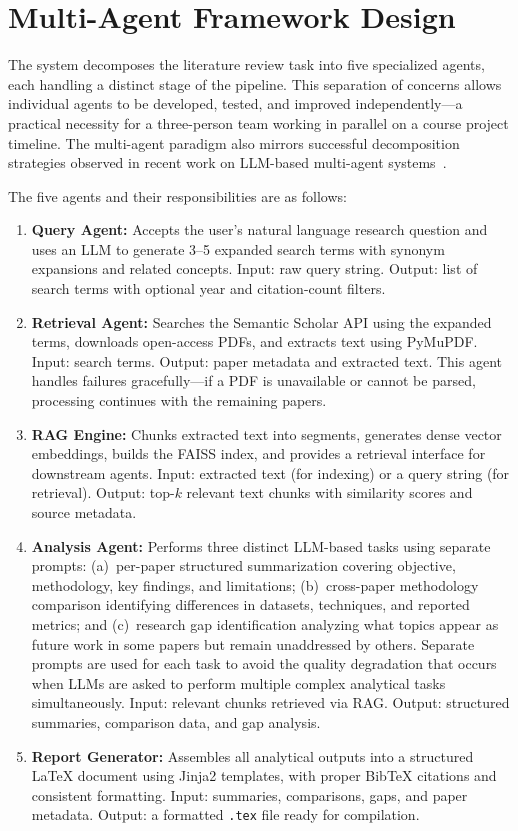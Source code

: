 \documentclass[12pt,a4paper]{article}
\begin{document}
\section{Multi-Agent Framework Design}

The system decomposes the literature review task into five specialized agents, each handling a distinct stage of the pipeline. This separation of concerns allows individual agents to be developed, tested, and improved independently---a practical necessity for a three-person team working in parallel on a course project timeline. The multi-agent paradigm also mirrors successful decomposition strategies observed in recent work on LLM-based multi-agent systems~\citep{guo2024multiagent}.

The five agents and their responsibilities are as follows:

\begin{enumerate}
    \item \textbf{Query Agent:} Accepts the user's natural language research question and uses an LLM to generate 3--5 expanded search terms with synonym expansions and related concepts. Input: raw query string. Output: list of search terms with optional year and citation-count filters.

    \item \textbf{Retrieval Agent:} Searches the Semantic Scholar API using the expanded terms, downloads open-access PDFs, and extracts text using PyMuPDF. Input: search terms. Output: paper metadata and extracted text. This agent handles failures gracefully---if a PDF is unavailable or cannot be parsed, processing continues with the remaining papers.

    \item \textbf{RAG Engine:} Chunks extracted text into segments, generates dense vector embeddings, builds the FAISS index, and provides a retrieval interface for downstream agents. Input: extracted text (for indexing) or a query string (for retrieval). Output: top-$k$ relevant text chunks with similarity scores and source metadata.

    \item \textbf{Analysis Agent:} Performs three distinct LLM-based tasks using separate prompts: (a)~per-paper structured summarization covering objective, methodology, key findings, and limitations; (b)~cross-paper methodology comparison identifying differences in datasets, techniques, and reported metrics; and (c)~research gap identification analyzing what topics appear as future work in some papers but remain unaddressed by others. Separate prompts are used for each task to avoid the quality degradation that occurs when LLMs are asked to perform multiple complex analytical tasks simultaneously. Input: relevant chunks retrieved via RAG. Output: structured summaries, comparison data, and gap analysis.

    \item \textbf{Report Generator:} Assembles all analytical outputs into a structured LaTeX document using Jinja2 templates, with proper BibTeX citations and consistent formatting. Input: summaries, comparisons, gaps, and paper metadata. Output: a formatted \texttt{.tex} file ready for compilation.
\end{enumerate}
\end{document}
